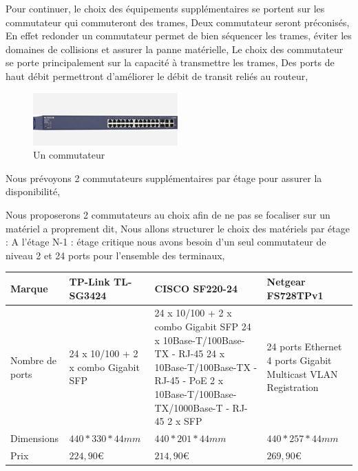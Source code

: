 Pour continuer, le choix des équipements supplémentaires se portent sur les commutateur qui commuteront des trames, Deux commutateur seront préconisés, En effet redonder un commutateur permet de bien séquencer les trames, éviter les domaines de collisions et assurer la panne matérielle,
Le choix des commutateur se porte principalement sur la capacité à transmettre les trames, Des ports de haut débit permettront d'améliorer le débit de transit reliés au routeur,

\begin{figure}[!ht]
    \center
    \includegraphics[width=0.5\textwidth]{./images/10.png}
    \caption{Un commutateur}
\end{figure}

Nous prévoyons 2 commutateurs supplémentaires par étage pour assurer la disponibilité,

Nous proposerons 2 commutateurs au choix afin de ne pas se focaliser sur un matériel a proprement dit,
Nous allons structurer le choix des matériels par étage :
A l'étage N-1 : étage critique nous avons  besoin d'un seul commutateur de niveau 2 et 24 ports pour l'ensemble des terminaux,


    \begin{center}
        \begin{tabular}{|l|p{4cm}|p{4cm}|p{4cm}|}
          \hline
            Marque  &  TP-Link TL-SG3424 &   CISCO SF220-24 &  Netgear FS728TPv1 \\
          \hline

Nombre de ports
  &   24 x 10/100 + 2 x combo Gigabit SFP
    &   24 x 10/100 + 2 x combo Gigabit SFP
24 x 10Base-T/100Base-TX - RJ-45
24 x 10Base-T/100Base-TX - RJ-45 - PoE
2 x 10Base-T/100Base-TX/1000Base-T - RJ-45
2 x SFP  & 24 ports Ethernet
4 ports Gigabit
Multicast VLAN Registration \\
          \hline
            Dimensions  &   $440 * 330 * 44 mm $                       &   $440 * 201 * 44 mm$ & $440 * 257 * 44 mm$                 \\
          \hline
            Prix  &
$224,90  \euro   $
    &
$214,90   \euro   $
 &
$269,90   \euro   $
 \\
          \hline
        \end{tabular}
    \end{center}

